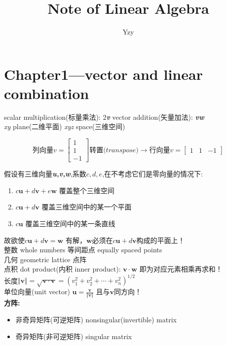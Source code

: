 \documentclass[UTF8]{article}
\begin{document}
    \title{Note of Linear Algebra}
    \author{Yzy}
    \maketitle
    \tableofcontents

    \section{Chapter1---vector and linear combination}
    
    scalar multiplication(标量乘法): 2\textbf{\textit{v}}
    \quad
    vector addition(矢量加法): \textbf{\textit{vw}}
    \\
    \textit{xy} plane(二维平面) \quad \textit{xyz} space(三维空间)
     
    $$
    \textit{列向量v} =
    \begin{bmatrix}
        1 \\ 1 \\ -1  
    \end{bmatrix}
    \textit{转置(transpose)}\rightarrow
    \textit{行向量v} = 
    \begin{bmatrix}
        1 & 1 & -1
    \end{bmatrix}
    $$

    假设有三维向量\textbf{\textit{u,v,w}},系数$c,d,e$,在不考虑它们是零向量的情况下:
    \begin{enumerate}
            \item $c\bm{u}+d\bm{v}+e\bm{w}$ 覆盖整个三维空间
            \item $c\bm{u}+d\bm{v}$ 覆盖三维空间中的某一个平面
            \item $c\bm{u}$ 覆盖三维空间中的某一条直线
    \end{enumerate}
    故欲使$c\bm{u}+d\bm{v} = \bm{w}$ 有解，$\bm{w}$必须在$c\bm{u}+d\bm{v}$构成的平面上！
    \\
    整数 whole numbers \quad 等间距点 equally spaced points
    \\
    几何 geometric \quad lattice 点阵
    \\
    点积 dot product(内积 inner product): $\bm{v} \cdot \bm{w}$ 即为对应元素相乘再求和！
    \\
    长度$\Vert \bm{v} \Vert = \sqrt{\bm{v \cdot v}} = (v_{1}^{2}+v_{2}^{2}+\cdots+v_{n}^{2})^{1/2}$ 
    \\
    单位向量(unit vector) $\bm{u} = \frac{\bm{v}}{ \Vert \bm{v} \Vert}$ 且与$\bm{v}$同方向！ \\
    \textbf{方阵:}
    \begin{itemize}
        \item 非奇异矩阵(可逆矩阵) nonsingular(invertible) matrix
        \item 奇异矩阵(非可逆矩阵) singular matrix
    \end{itemize}    
\end{document}
